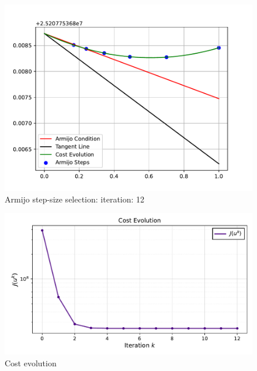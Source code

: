 \begin{figure}[htb]
    \centering
    \includegraphics[width=1\linewidth]{img/2-task2/Armijo_iter_12.pdf}
    \caption{Armijo step-size selection: iteration: 12}
    \label{fig:armijo1}
\end{figure}
\begin{figure}[htb]
    \centering
    \includegraphics[width=1\linewidth]{img/2-task2/Cost_evolution.pdf}
    \caption{Cost evolution}
    \label{fig:armijo1}
\end{figure}


